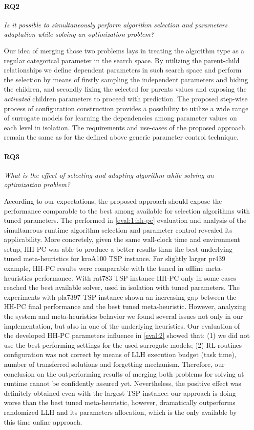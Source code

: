 \paragraph{RQ2} \emph{Is it possible to simultaneously perform algorithm selection and parameters adaptation while solving an optimization problem?}
	
Our idea of merging those two problems lays in treating the algorithm type as a regular categorical parameter in the search space. By utilizing the parent-child relationships we define dependent parameters in such search space and perform the selection by means of firstly sampling the independent parameters and hiding the children, and secondly fixing the selected for parents values and exposing the \emph{activated} children parameters to proceed with prediction. The proposed step-wise process  of configuration construction provides a possibility to utilize a wide range of surrogate models for learning the dependencies among parameter values on each level in isolation. The requirements and use-cases of the proposed approach remain the same as for the defined above generic parameter control technique.
	
\paragraph{RQ3} \emph{What is the effect of selecting and adapting algorithm while solving an optimization problem?}

According to our expectations, the proposed approach should expose the performance comparable to the best among available for selection algorithms with tuned parameters. The performed in \cref{eval:1:hh-pc} evaluation and analysis of the simultaneous runtime algorithm selection and parameter control revealed its applicability. More concretely, given the same wall-clock time and environment setup, HH-PC was able to produce a better results than the best underlying tuned meta-heuristics for kroA100 TSP instance. For slightly larger pr439 example, HH-PC results were comparable with the tuned in offline meta-heuristics performance. With rat783 TSP instance HH-PC only in some cases reached the best available solver, used in isolation with tuned parameters. The experiments with pla7397 TSP instance shown an increasing gap between the HH-PC final performance and the best tuned meta-heuristic. However, analyzing the system and meta-heuristics behavior we found several issues not only in our implementation, but also in one of the underlying heuristics. Our evaluation of the developed HH-PC parameters influence in \cref{eval:2} showed that: (1) we did not use the best-performing settings for the used surrogate models; (2) RL routines configuration was not correct by means of LLH execution budget (task time), number of transferred solutions and forgetting mechanism. Therefore, our conclusion on the outperforming results of merging both problems for solving at runtime cannot be confidently assured yet. Nevertheless, the positive effect was definitely obtained even with the largest TSP instance: our approach is doing worse than the best tuned meta-heuristic, however, dramatically outperforms randomized LLH and its parameters allocation, which is the only available by this time online approach.

